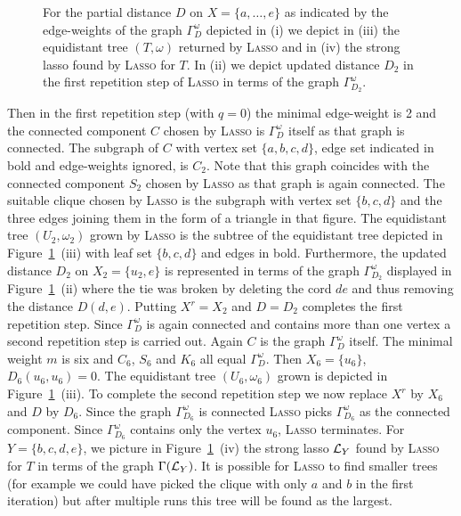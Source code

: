 \begin{figure}
  \centering
  
  \caption{For the partial distance $D$ on $X=\{a,\ldots, e\}$ as indicated by
    the edge-weights of the graph $\Gamma^{\omega}_D$ depicted in (i) we
    depict in (iii) the equidistant tree $(T,\omega)$ returned by \textsc{Lasso}
    and in (iv) the strong lasso found by \textsc{Lasso} for $T$. In (ii) we
    depict updated distance $D_2$ in the first repetition step of \textsc{Lasso}
    in terms of the graph $\Gamma^{\omega}_{D_2}$.}
  \label{fig:pink-const}
\end{figure}
% 
Then in the first repetition step (with $q=0$) the minimal edge-weight is 2
and the connected component $C$ chosen by \textsc{Lasso} is
$\Gamma^{\omega}_D$ itself as that graph is connected. The subgraph of $C$
with vertex set $\{a,b,c,d\}$, edge set indicated in bold and edge-weights
ignored, is $C_2$. Note that this graph coincides with the connected component
$S_2$ chosen by \textsc{Lasso} as that graph is again connected. The suitable
clique chosen by \textsc{Lasso} is the subgraph with vertex set $\{b,c,d\}$
and the three edges joining them in the form of a triangle in that figure.
The equidistant tree $(U_2,\omega_2)$ grown by \textsc{Lasso} is the subtree
of the equidistant tree depicted in Figure~\ref{fig:pink-const}~(iii) with
leaf set $\{b,c,d\}$ and edges in bold. Furthermore, the updated distance
$D_2$ on $X_2=\{u_2,e\}$ is represented in terms of the graph
$\Gamma^{\omega}_{D_2}$ displayed in Figure~\ref{fig:pink-const}~(ii) where
the tie was broken by deleting the cord $de$ and thus removing the distance
$D(d,e)$. Putting $X^r=X_2$ and $D=D_2$ completes the first repetition
step. Since $\Gamma^{\omega}_D$ is again connected and contains more than one
vertex a second repetition step is carried out. Again $C$ is the graph
$\Gamma^{\omega}_D$ itself.  The minimal weight $m$ is six and $C_6$, $S_6$
and $K_6$ all equal $\Gamma^{\omega}_D$. Then $X_6=\{u_6\}$,
$D_6(u_6,u_6)=0$. The equidistant tree $(U_6,\omega_6)$ grown is depicted in
Figure~\ref{fig:pink-const}~(iii). To complete the second repetition step we
now replace $X^r$ by $X_6$ and $D$ by $D_6$. Since the graph
$\Gamma^{\omega}_{D_6}$ is connected \textsc{Lasso} picks
$\Gamma^{\omega}_{D_6}$ as the connected component. Since
$\Gamma^{\omega}_{D_6}$ contains only the vertex $u_6$, \textsc{Lasso}
terminates. For $Y=\{b,c,d,e\}$, we picture in
Figure~\ref{fig:pink-const}~(iv) the strong lasso ${\mathcal L}_Y$ found by
\textsc{Lasso} for $T$ in terms of the graph $\Gamma({\mathcal L}_Y)$.  It is possible
for \textsc{Lasso} to find smaller trees (for example we could have picked the
clique with only $a$ and $b$ in the first iteration) but after multiple runs
this tree will be found as the largest.


